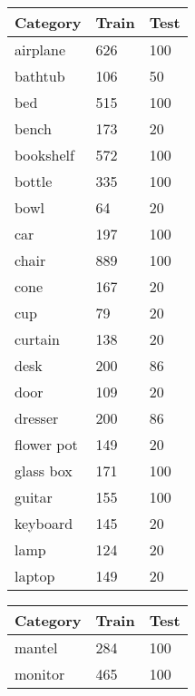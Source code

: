 \begin{table}[]
	\begin{tabular}[t]{lll}
		\hline
		\textbf{Category} & \textbf{Train} & \textbf{Test} \\ \hline
		airplane          & 626            & 100           \\
		bathtub           & 106            & 50            \\
		bed               & 515            & 100           \\
		bench             & 173            & 20            \\
		bookshelf         & 572            & 100           \\
		bottle            & 335            & 100           \\
		bowl              & 64             & 20            \\
		car               & 197            & 100           \\
		chair             & 889            & 100           \\
		cone              & 167            & 20            \\
		cup               & 79             & 20            \\
		curtain           & 138            & 20            \\
		desk              & 200            & 86            \\
		door              & 109            & 20            \\
		dresser           & 200            & 86            \\
		flower pot        & 149            & 20            \\
		glass box         & 171            & 100           \\
		guitar            & 155            & 100           \\
		keyboard          & 145            & 20            \\
		lamp              & 124            & 20            \\
		laptop            & 149            & 20
	\end{tabular}
	\begin{tabular}[t]{lll}
		\hline
		\textbf{Category} & \textbf{Train} & \textbf{Test} \\ \hline
		mantel            & 284            & 100           \\
		monitor           & 465            & 100           \\

\end{tabular}
\end{table}
